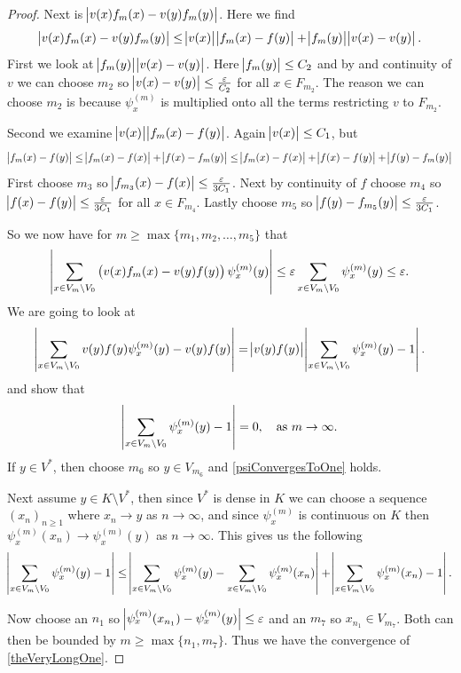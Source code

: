 \begin{proof}
	Next is $\abs{v(x) f_m(x) - v(y)f_m(y)}$. Here we find
	\begin{equation}
		\abs{v(x) f_m(x) - v(y)f_m(y)} \leq \abs{v(x)}\abs{f_m(x)-f(y)} + \abs{f_m(y)}\abs{v(x)-v(y)}.
	\end{equation}
	First we look at $\abs{f_m(y)}\abs{v(x)-v(y)}$. Here $\abs{f_m(y)} \leq C_2$ and by  and continuity of $v$ we can choose $m_2$ so $\abs{v(x)-v(y)} \leq \frac{\varepsilon}{C_2}$ for all $x \in F_{m_2}$. The reason we can choose $m_2$ is because $\psi_{x}^{(m)}$ is multiplied onto all the terms restricting $v$ to $F_{m_2}$.
	
	\medskip
	Second we examine $\abs{v(x)}\abs{f_m(x)-f(y)}$. Again $\abs{v(x)} \leq C_1$, but
	\begin{equation}
		\abs{f_m(x)-f(y)} \leq \abs{f_m(x)-f(x)} + \abs{f(x) - f_m(y)} \leq \abs{f_m(x)-f(x)} + \abs{f(x) -f(y)} + \abs{f(y) - f_m(y)}
	\end{equation}
	First choose $m_3$ so $\abs{f_{m_3}(x)-f(x)} \leq \frac{\varepsilon}{3 C_1}$. Next by continuity of $f$ choose $m_4$ so \\ $\abs{f(x) -f(y)} \leq \frac{\varepsilon}{3 C_1}$ for all $x \in F_{m_4}$. Lastly choose $m_5$ so $\abs{f(y)-f_{m_5}(y)} \leq \frac{\varepsilon}{3 C_1}$.
	
	So we now have for $m \geq \max \{m_1, m_2, \ldots, m_5\}$ that
	\begin{equation}
		\abs{\sum_{x \in V_m \setminus V_0} \left(v(x) f_m(x) - v(y)f(y) \right) \psi_x^{(m)}(y)} \leq \epsilon \sum_{x \in V_m \setminus V_0} \psi_x^{(m)}(y) \leq \epsilon.
	\end{equation}
	We are going to look at 
	\begin{equation}
		\abs{\sum_{x \in V_m \setminus V_0} v(y) f(y) \psi_x^{(m)}(y) -v(y)f(y)} = \abs{v(y)f(y)}\abs{\sum_{x \in V_m \setminus V_0} \psi_x^{(m)}(y) - 1}.
	\end{equation}
	and show that 
	\begin{equation}\label{psiConvergesToOne}
	\abs{\sum_{x \in V_m \setminus V_0} \psi_x^{(m)}(y) - 1} = 0, \quad \text{as } m \to \infty.
	\end{equation}
	If  $y \in V^*$, then choose $m_6$ so $y \in V_{m_6}$ and \eqref{psiConvergesToOne} holds.
	
	Next assume $y \in K \setminus V^{*}$, then since $V^{*}$ is dense in $K$ we can choose a sequence $(x_n)_{n \geq 1}$ where $x_n \to y$ as $n \to \infty$, and since $\psi_{x}^{(m)}$ is continuous on $K$ then $\psi_{x}^{(m)}(x_n) \to \psi_{x}^{(m)}(y)$ as $n \to \infty$. This gives us the following
	\begin{align}
		\abs{\sum_{x \in V_m \setminus V_0} \psi_x^{(m)}(y) - 1} \leq \abs{\sum_{x \in V_m \setminus V_0} \psi_x^{(m)}(y) - \sum_{x \in V_m \setminus V_0} \psi_x^{(m)}(x_n)} + \abs{\sum_{x \in V_m \setminus V_0} \psi_x^{(m)}(x_n) - 1}.
	\end{align}
	
	Now choose an $n_1$ so $\abs{\psi_{x}^{(m)}(x_{n_1}) - \psi_{x}^{(m)}(y)} \leq \varepsilon$ and an $m_7$ so $x_{n_1} \in V_{m_7}$. Both can then be bounded by $m \geq \max \{n_1, m_7\}$. Thus we have the convergence of \eqref{theVeryLongOne}.
\end{proof}

